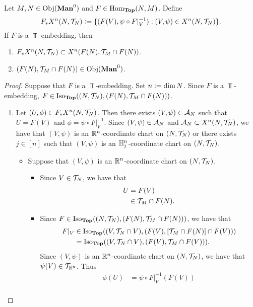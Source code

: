 \documentclass{book}
\begin{document}
\begin{ex} 
	Let $M, N \in \Obj(\Man0)$ and $F \in \operatorname{Hom}_{\operatorname*{\text{\textbf{Top}}}}(N, M)$. Define 
	$$F_*X^n(N, \mathcal{T}_N) \vcentcolon= \{(F(V), \psi \circ F|_V^{-1}): (V, \psi) \in X^n(N, \mathcal{T}_N)\}.$$ 
	If $F$ is a $\Top$-embedding, then 
	\begin{enumerate}
		\item $F_*X^n(N, \mathcal{T}_N) \subset X^n(F(N), \mathcal{T}_M \cap F(N))$.
		\item $(F(N), \MT_M \cap F(N)) \in \Obj(\Man0)$.
	\end{enumerate}
\end{ex}

\begin{proof}
	Suppose that $F$ is a $\Top$-embedding. Set $n \vcentcolon= \dim N$. Since $F$ is a $\Top$-embedding, $F \in \operatorname{Iso}_{\operatorname*{\text{\textbf{Top}}}}((N, \mathcal{T}_N), (F(N), \mathcal{T}_M \cap F(N)))$.
	\begin{enumerate}
		\item Let $(U, \phi) \in F_*X^n(N, \mathcal{T}_N)$. Then there exists $(V, \psi) \in \mathcal{A}_N$ such that $U = F(V)$ and $\phi = \psi \circ F|_V^{-1}$. Since $(V, \psi) \in \mathcal{A}_N$ and $\mathcal{A}_N \subset X^n(N, \mathcal{T}_N)$, we have that $(V, \psi)$ is an $\mathbb{R}^n$-coordinate chart on $(N, \mathcal{T}_N)$ or there exists $j \in [n]$ such that $(V, \psi)$ is an $\mathbb{H}^n_j$-coordinate chart on $(N, \mathcal{T}_N)$. 
		\begin{itemize}
			\item Suppose that $(V, \psi)$ is an $\mathbb{R}^n$-coordinate chart on $(N, \mathcal{T}_N)$. 
			\begin{itemize}
				\item Since $V \in \mathcal{T}_N$, we have that 
				\begin{align*}
					U
					& = F(V) \\
					& \in \mathcal{T}_M \cap F(N).
				\end{align*}
				\item Since $F \in \operatorname{Iso}_{\operatorname*{\text{\textbf{Top}}}}((N, \mathcal{T}_N), (F(N), \mathcal{T}_M \cap F(N)))$, we have that 
				\begin{align*}
					F|_V 
					& \in \operatorname{Iso}_{\operatorname*{\text{\textbf{Top}}}}((V, \mathcal{T}_N \cap V), (F(V), [\mathcal{T}_M \cap F(N)] \cap F(V))) \\
					& = \operatorname{Iso}_{\operatorname*{\text{\textbf{Top}}}}((V, \mathcal{T}_N \cap V), (F(V), \mathcal{T}_M \cap F(V))).
				\end{align*}
				Since $(V, \psi)$ is an $\mathbb{R}^n$-coordinate chart on $(N, \mathcal{T}_N)$, we have that $\psi(V) \in \mathcal{T}_{\mathbb{R}^n}$. Thus 
				\begin{align*}
					\phi(U)
					& = \psi \circ F|_V^{-1}( F(V)) \\

\end{align*}
\end{itemize}
\end{itemize}
\end{enumerate}
\end{proof}
\end{document}
